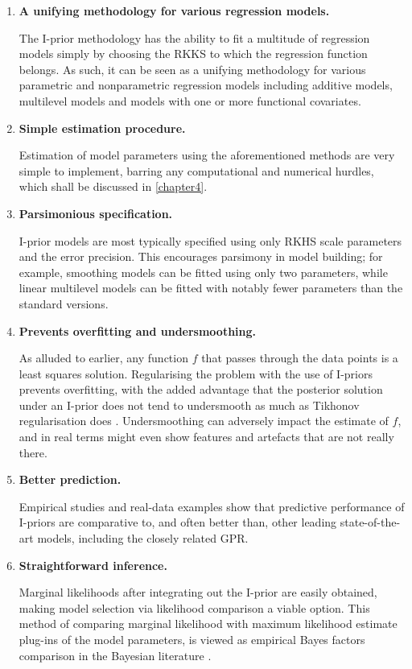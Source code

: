 \documentclass[11pt,twoside,openright,showframe]{report}
\begin{document}
\begin{enumerate}
  \item \textbf{A unifying methodology for various regression models.}
  
  The I-prior methodology has the ability to fit a multitude of regression models simply by choosing the RKKS to which the regression function belongs.
  As such, it can be seen as a unifying methodology for various parametric and nonparametric regression models including additive models, multilevel models and models with one or more functional covariates. 

  \item \textbf{Simple estimation procedure.}
  
  Estimation of model parameters using the aforementioned methods are very simple to implement, barring any computational and numerical hurdles, which shall be discussed in \cref{chapter4}.

  \item \textbf{Parsimonious specification.}
  
  I-prior models are most typically specified using only  RKHS scale parameters and the error precision.
  This encourages parsimony in model building; for example, smoothing models can be fitted using only two parameters, while linear multilevel models can be fitted with notably fewer parameters than the standard versions.
  
  \item \textbf{Prevents overfitting and undersmoothing.}
  
  As alluded to earlier, any function $f$ that passes through the data points is a least squares solution.
  Regularising the problem with the use of I-priors prevents overfitting, with the added advantage that the posterior solution under an I-prior does not tend to undersmooth as much as Tikhonov regularisation does \citep{bergsma2017}.
  Undersmoothing can adversely impact the estimate of $f$, and in real terms might even show features and artefacts that are not really there.
  
  \item \textbf{Better prediction.}
  
  Empirical studies and real-data examples show that predictive performance of I-priors are comparative to, and often better than, other leading state-of-the-art models, including the closely related GPR.

  \item \textbf{Straightforward inference.}
  
  Marginal likelihoods after integrating out the I-prior are easily obtained, making model selection via likelihood comparison a viable option.
  This method of comparing marginal likelihood with maximum likelihood estimate plug-ins of the model parameters, is viewed as empirical Bayes factors comparison in the Bayesian literature \citep{george2000calibration,casella1985introduction}.
  
\end{enumerate}
\end{document}

